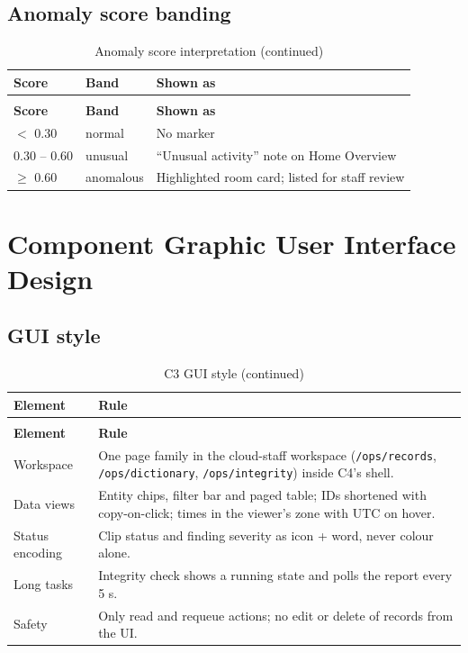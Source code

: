 \subsection{Anomaly score banding}
\begin{longtable}{L{3.6cm}L{4.0cm}L{6.8cm}}
\caption{Anomaly score interpretation}\\
\toprule
\textbf{Score} & \textbf{Band} & \textbf{Shown as} \\
\midrule
\endfirsthead
\caption[]{Anomaly score interpretation (continued)}\\
\toprule
\textbf{Score} & \textbf{Band} & \textbf{Shown as} \\
\midrule
\endhead
$<$ 0.30 & normal & No marker \\
0.30 -- 0.60 & unusual & ``Unusual activity'' note on Home Overview \\
$\geq$ 0.60 & anomalous & Highlighted room card; listed for staff review \\
\bottomrule
\end{longtable}

\section{Component Graphic User Interface Design}

\subsection{GUI style}
\begin{longtable}{L{3.0cm}L{11.8cm}}
\caption{C3 GUI style}\\
\toprule
\textbf{Element} & \textbf{Rule} \\
\midrule
\endfirsthead
\caption[]{C3 GUI style (continued)}\\
\toprule
\textbf{Element} & \textbf{Rule} \\
\midrule
\endhead
Workspace & One page family in the cloud-staff workspace (\texttt{/ops/records}, \texttt{/ops/dictionary}, \texttt{/ops/integrity}) inside C4's shell. \\
Data views & Entity chips, filter bar and paged table; IDs shortened with copy-on-click; times in the viewer's zone with UTC on hover. \\
Status encoding & Clip status and finding severity as icon + word, never colour alone. \\
Long tasks & Integrity check shows a running state and polls the report every 5 s. \\
Safety & Only read and requeue actions; no edit or delete of records from the UI. \\
\bottomrule
\end{longtable}

